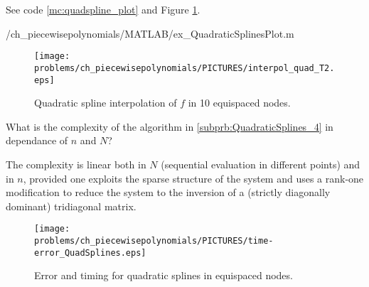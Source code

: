 \begin{problem}
\begin{subproblem}[1]
\begin{solution}See code \ref{mc:quadspline_plot} and Figure \ref{fig:interpol_quad_T2}.

{\problems/ch_piecewisepolynomials/MATLAB/ex_QuadraticSplinesPlot.m}
\begin{figure}[htb]
\caption{Quadratic spline interpolation of $f$ in 10 equispaced nodes.}\label{fig:interpol_quad_T2}
\centering \texttt{[image: \\problems/ch\_piecewisepolynomials/PICTURES/interpol\_quad\_T2.eps]}
\end{figure}
\end{solution}
\end{subproblem}

%


\begin{subproblem}[1]  \label{subprb:QuadraticSplines_6}
What is the complexity of the algorithm in \ref{subprb:QuadraticSplines_4} in dependance of $n$ and $N$?

\begin{solution}
The complexity is linear both in $N$ (sequential evaluation in different points) and in $n$, provided one exploits the sparse structure of the system and uses a rank-one modification to reduce the system to the inversion of a (strictly diagonally dominant) tridiagonal matrix.
% 
\begin{figure}[htb]
\caption{Error and timing for quadratic splines in equispaced nodes.}\label{fig:time-error_QuadSplines}
\centering \texttt{[image: \\problems/ch\_piecewisepolynomials/PICTURES/time-error\_QuadSplines.eps]}
\end{figure}
\end{solution}
\end{subproblem}
\end{problem}

